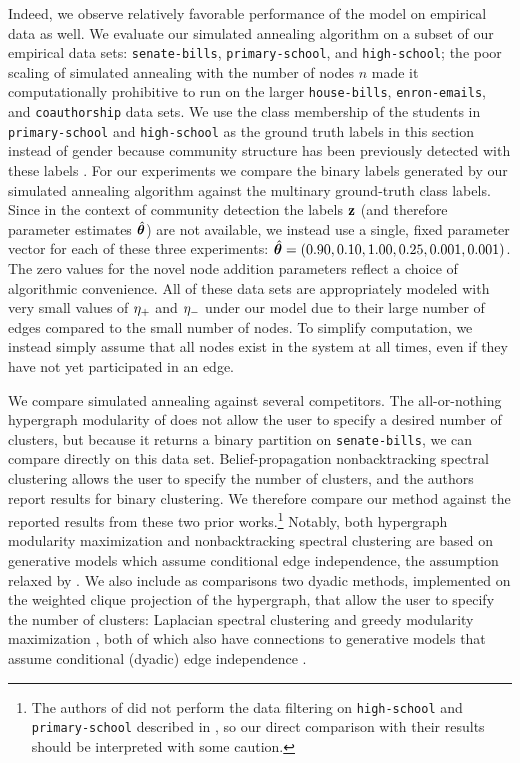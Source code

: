\documentclass[aps,pre,reprint,superscriptaddress,nofootinbib]{revtex4-2}
\begin{document}
Indeed, we observe relatively favorable performance of the \model{} model on empirical data as well. 
We evaluate our simulated annealing algorithm on a subset of our empirical data sets: \texttt{senate-bills}, \texttt{primary-school}, and \texttt{high-school}; the poor scaling of simulated annealing with the number of nodes $n$ made it computationally prohibitive to run on the larger \texttt{house-bills}, \texttt{enron-emails}, and \texttt{coauthorship} data sets.
We use the class membership of the students in \texttt{primary-school} and \texttt{high-school} as the ground truth labels in this section instead of gender because community structure has been previously detected with these labels \cite{chodrowGenerativeHypergraphClustering2021}.  
For our experiments we compare the binary labels generated by our simulated annealing algorithm against the multinary ground-truth class labels. 
Since in the context of community detection the labels $\mathbf{z}$ (and therefore parameter estimates $\hat{\boldsymbol{\theta}}$) are not available, we instead use a single, fixed parameter vector for each of these three experiments: $\hat{\boldsymbol{\theta}} = (0.90, 0.10, 1.00, 0.25, 0.001, 0.001)$.
The zero values for the novel node addition parameters reflect a choice of algorithmic convenience. 
All of these data sets are appropriately modeled with very small values of $\eta_+$ and $\eta_-$ under our model due to their large number of edges compared to the small number of nodes.  
To simplify computation, we instead simply assume that all nodes exist in the system at all times, even if they have not yet participated in an edge. 

We compare \model{} simulated annealing against several competitors. 
The all-or-nothing hypergraph modularity of \cite{chodrowGenerativeHypergraphClustering2021} does not allow the user to specify a desired number of clusters, but because it returns a binary partition on \texttt{senate-bills}, we can compare directly on this data set. 
Belief-propagation nonbacktracking spectral clustering \cite{chodrowNonbacktrackingSpectralClustering2023} allows the user to specify the number of clusters, and the authors report results for binary clustering. 
We therefore compare our method against the reported results from these two prior works.\footnote{The authors of \cite{chodrowNonbacktrackingSpectralClustering2023} did not perform the data filtering on \texttt{high-school} and \texttt{primary-school} described in , so our direct comparison with their results should be interpreted with some caution.}
Notably, both hypergraph modularity maximization and nonbacktracking spectral clustering are based on generative models which assume conditional edge independence, the assumption relaxed by \model{}.
We also include as comparisons two dyadic methods, implemented on the weighted clique projection of the hypergraph, that allow the user to specify the number of clusters: Laplacian spectral clustering \cite{luxburg2007tutorial} and greedy modularity maximization \cite{clauset2004finding}, both of which also have connections to generative models that assume conditional (dyadic) edge independence \cite{newman2016equivalence,lei2015consistency}.
\end{document}
